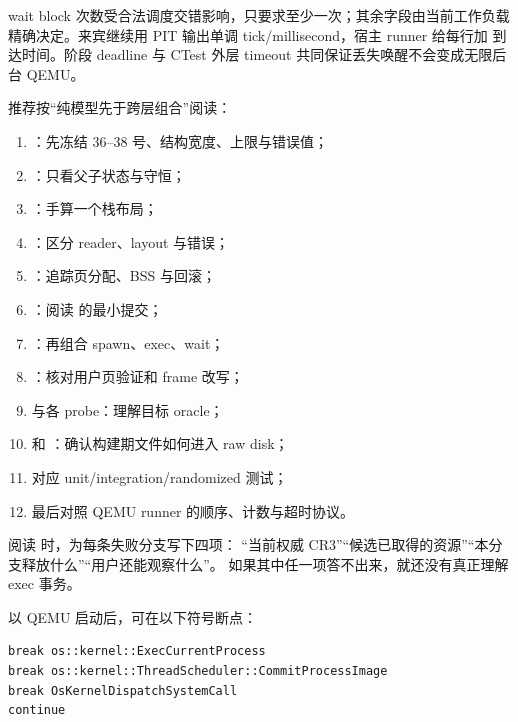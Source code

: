 wait block 次数受合法调度交错影响，只要求至少一次；其余字段由当前工作负载
精确决定。来宾继续用 PIT 输出单调 tick/millisecond，宿主 runner 给每行加
\code{[QEMU][T+...ms]} 到达时间。阶段 deadline 与 CTest 外层 timeout
共同保证丢失唤醒不会变成无限后台 QEMU。

推荐按“纯模型先于跨层组合”阅读：

\begin{enumerate}
  \item {}：先冻结 36--38
        号、结构宽度、上限与错误值；
  \item {}：只看父子状态与守恒；
  \item {}：手算一个栈布局；
  \item {}：区分 reader、layout 与错误；
  \item {}：追踪页分配、BSS 与回滚；
  \item {}：阅读
         的最小提交；
  \item {}：再组合 spawn、exec、wait；
  \item {}：核对用户页验证和 frame 改写；
  \item {} 与各 probe：理解目标 oracle；
  \item {} 和
        ：确认构建期文件如何进入 raw disk；
  \item 对应 unit/integration/randomized 测试；
  \item 最后对照 QEMU runner 的顺序、计数与超时协议。
\end{enumerate}

阅读  时，为每条失败分支写下四项：
“当前权威 CR3”“候选已取得的资源”“本分支释放什么”“用户还能观察什么”。
如果其中任一项答不出来，就还没有真正理解 exec 事务。

以 QEMU  启动后，可在以下符号断点：

\begin{lstlisting}[caption={exec 的硬件状态观察点}]
break os::kernel::ExecCurrentProcess
break os::kernel::ThreadScheduler::CommitProcessImage
break OsKernelDispatchSystemCall
continue
\end{lstlisting}

